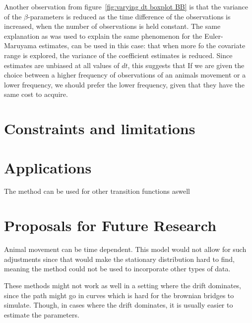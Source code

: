 Another observation from figure~\ref{fig:varying dt boxplot BB} is that the variance of the $\beta$-parameters is reduced as the time difference of the observations is increased, when the number of observations is held constant. The same explanation as was used to explain the same phenomenon for the Euler-Maruyama estimates, can be used in this case: that when more fo the covariate range is explored, the variance of the coefficient estimates is reduced. Since estimates are unbiased at all values of $dt$, this suggests that If we are given the choice between a higher frequency of observations of an animals movement or a lower frequency, we should prefer the lower frequency, given that they have the same cost to acquire.













\section{Constraints and limitations}







\section{Applications}
The method can be used for other transition functions aswell







\section{Proposals for Future Research}




Animal movement can be time dependent. This model would not allow for such adjustments since that would make the stationary distribution hard to find, meaning the method could not be used to incorporate other types of data.



These methods might not work as well in a setting where the drift dominates, since the path might go in curves which is hard for the brownian bridges to simulate. Though, in cases where the drift dominates, it is usually easier to estimate the parameters.


